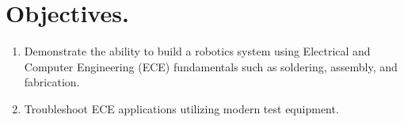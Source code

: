 \documentclass{handout}
\begin{document}
	\maketitle
	
	\section{Objectives.} 
	\begin{enumerate}
		\item Demonstrate the ability to build a robotics system using Electrical and Computer Engineering (ECE) fundamentals such as soldering, assembly, and fabrication.
		\item Troubleshoot ECE applications utilizing modern test equipment.
	\end{enumerate}
	
\end{document}

